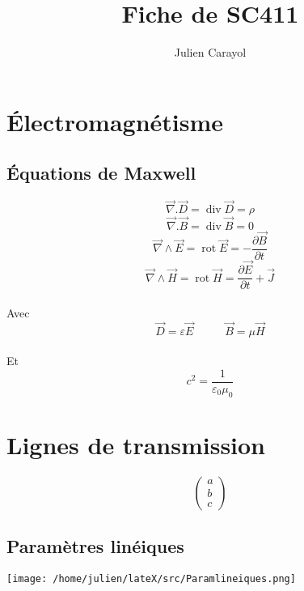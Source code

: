 \documentclass{article}
\author{Julien Carayol}
\title{Fiche de SC411}
\DeclareMathOperator{\Div}{div}
\DeclareMathOperator{\Rot}{rot}
\newcommand{\parder}[2]{\frac{\partial {#1}}{\partial {#2}}}
\begin{document}
\newpage
\section{Électromagnétisme}
\subsection{Équations de Maxwell}

  \[\vec{\nabla}.\vec{D}=\Div\vec{D}=\rho\]
  \[\vec{\nabla}.\vec{B}=\Div\vec{B}=0\]
  \[\vec{\nabla}\wedge\vec{E}=\Rot\vec{E}=-\parder{\vec{B}}{t}\]
\[\vec{\nabla}\wedge\vec{H}=\Rot\vec{H}=\parder{\vec{E}}{t} +\vec{J} \]
\\Avec
\[\vec{D}=\varepsilon\vec{E}\;\;\;\;\;\;\;\;\;\;\vec{B}=\mu\vec{H}\]
\\Et \[c^2=\frac{1}{\varepsilon_0\mu_0}\]
\section{Lignes de transmission}
\[\left( \begin{array}{c}
a\\
b\\
c
\end{array} \right)\]
\subsection{Paramètres linéiques}
\begin{center}
  \texttt{[image: /home/julien/lateX/src/Paramlineiques.png]}
\end{center}
\end{document}
